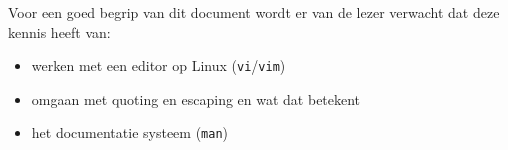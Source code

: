 Voor een goed begrip van dit document wordt er van de lezer verwacht dat deze kennis heeft van:
\begin{itemize}
\item werken met een editor op Linux (\texttt{vi}/\texttt{vim})
\item omgaan met quoting en escaping en wat dat betekent
\item het documentatie systeem (\texttt{man}) 
\end{itemize}
